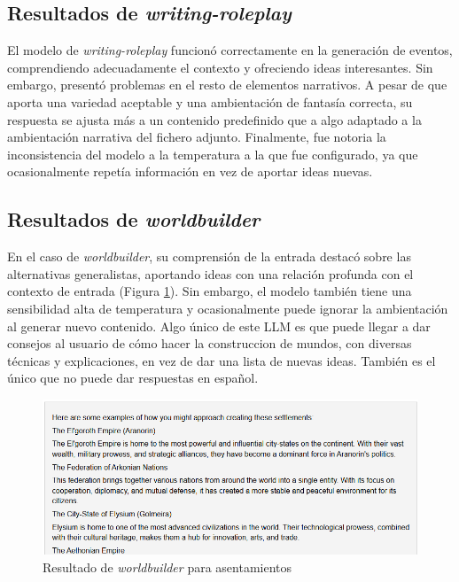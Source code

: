 \subsection{Resultados de \textit{writing-roleplay}}
El modelo de \textit{writing-roleplay} funcionó correctamente en la generación de eventos,
comprendiendo adecuadamente el contexto y ofreciendo ideas interesantes.
Sin embargo, presentó problemas en el resto de elementos narrativos.
A pesar de que aporta una variedad aceptable y una ambientación de fantasía correcta,
su respuesta se ajusta más a un contenido predefinido que a algo adaptado a la ambientación
narrativa del fichero adjunto.
Finalmente, fue notoria la inconsistencia del modelo a la temperatura a la que fue configurado,
ya que ocasionalmente repetía información en vez de aportar ideas nuevas.

\subsection{Resultados de \textit{worldbuilder}}
En el caso de \textit{worldbuilder},
su comprensión de la entrada destacó sobre las alternativas generalistas,
aportando ideas con una relación profunda con el contexto de entrada
(Figura \ref{fig:worldbuilder-settle}).
Sin embargo, el modelo también tiene una sensibilidad alta de temperatura
y ocasionalmente puede ignorar la ambientación al generar nuevo contenido.
Algo único de este LLM es que puede llegar a dar consejos al usuario de cómo
hacer la construccion de mundos, con diversas técnicas y explicaciones,
en vez de dar una lista de nuevas ideas.
También es el único que no puede dar respuestas en español.

\begin{figure}[htbp]
	\centering
	\includegraphics[width=1\textwidth]{./Figures/worldbuilder-noprompt-settlements.png}
	\caption{Resultado de \textit{worldbuilder} para asentamientos}
	\label{fig:worldbuilder-settle}
\end{figure}

